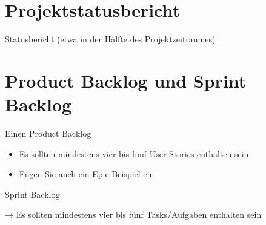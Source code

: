 \documentclass[12pt]{article}
\begin{document}
\section{Projektstatusbericht}
Statusbericht (etwa in der Hälfte des Projektzeitraumes)

\section{Product Backlog und Sprint Backlog}
Einen Product Backlog
\begin{itemize}
	\item Es sollten mindestens vier bis fünf User Stories enthalten sein
	\item Fügen Sie auch ein Epic Beispiel ein
\end{itemize}
Sprint Backlog

→ Es sollten mindestens vier bis fünf Tasks/Aufgaben enthalten sein
\end{document}
